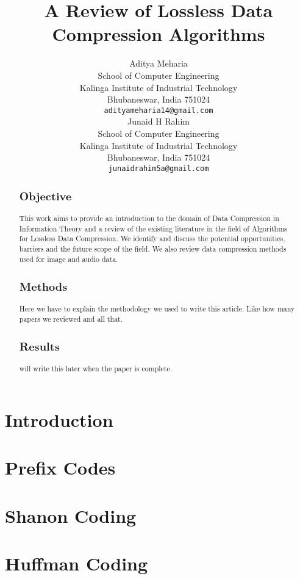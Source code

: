 \documentclass{article}
\title{A Review of Lossless Data Compression Algorithms}
\author{
	Aditya Meharia\\
	School of Computer Engineering\\
	Kalinga Institute of Industrial Technology\\
	Bhubaneswar, India 751024 \\
	\texttt{adityameharia14@gmail.com} \\
	\And
   	Junaid H Rahim\\
	School of Computer Engineering\\
	Kalinga Institute of Industrial Technology\\
	Bhubaneswar, India 751024 \\
	\texttt{junaidrahim5a@gmail.com} \\	
}
\begin{document}
\maketitle

\begin{abstract}
	
\subsection*{Objective}

This work aims to provide an introduction to the domain of Data Compression in Information Theory and a review of the existing literature in the field of Algorithms for Lossless Data Compression. We identify and discuss the potential opportunities, barriers and the future scope of the field. We also review data compression methods used for image and audio data.


\subsection*{Methods}
Here we have to explain the methodology we used to write this article. Like how many papers we reviewed and all that. \\
\lipsum[1]


\subsection*{Results}
will write this later when the paper is complete.

\lipsum[1]

\end{abstract}



\section{Introduction}

\section{Prefix Codes}
	
\section {Shanon Coding}

\section {Huffman Coding}
\end{document}
